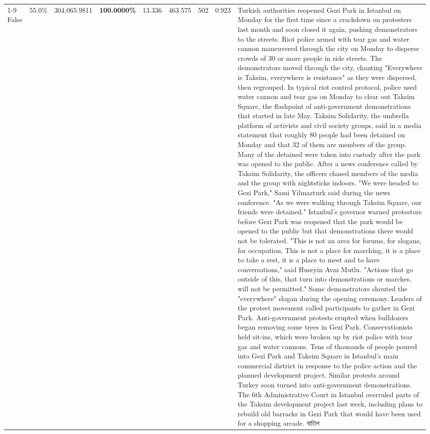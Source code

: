 \begin{table}[H]
\begin{tabular}{lllrlllll}
\cline{1-9}
False & 55.0\% & 304,065.9811 & \bfseries \color{red} 100.0000\% & 13.336 & 463.575 & 502 & 0.923 & Turkish authorities reopened Gezi Park in Istanbul on Monday for the first time since a crackdown on protesters last month and soon closed it again, pushing demonstrators to the streets. Riot police armed with tear gas and water cannon maneuvered through the city on Monday to disperse crowds of 30 or more people in side streets. The demonstrators moved through the city, chanting "Everywhere is Taksim, everywhere is resistance" as they were dispersed, then regrouped. In typical riot control protocol, police used water cannon and tear gas on Monday to clear out Taksim Square, the flashpoint of anti-government demonstrations that started in late May. Taksim Solidarity, the umbrella platform of activists and civil society groups, said in a media statement that roughly 80 people had been detained on Monday and that 32 of them are members of the group. Many of the detained were taken into custody after the park was opened to the public. After a news conference called by Taksim Solidarity, the officers chased members of the media and the group with nightsticks indoors. "We were headed to Gezi Park," Sami Yilmazturk said during the news conference. "As we were walking through Taksim Square, our friends were detained." Istanbul's governor warned protestors before Gezi Park was reopened that the park would be opened to the public but that demonstrations there would not be tolerated. "This is not an area for forums, for slogans, for occupation. This is not a place for marching, it is a place to take a rest, it is a place to meet and to have conversations," said Huseyin Avni Mutlu. "Actions that go outside of this, that turn into demonstrations or marches, will not be permitted." Some demonstrators shouted the "everywhere" slogan during the opening ceremony. Leaders of the protest movement called participants to gather in Gezi Park. Anti-government protests erupted when bulldozers began removing some trees in Gezi Park. Conservationists held sit-ins, which were broken up by riot police with tear gas and water cannons. Tens of thousands of people poured into Gezi Park and Taksim Square in Istanbul's main commercial district in response to the police action and the planned development project. Similar protests around Turkey soon turned into anti-government demonstrations. The 6th Administrative Court in Istanbul overruled parts of the Taksim development project last week, including plans to rebuild old barracks in Gezi Park that would have been used for a shopping arcade. বাতিল \\

\end{tabular}
\end{table}
